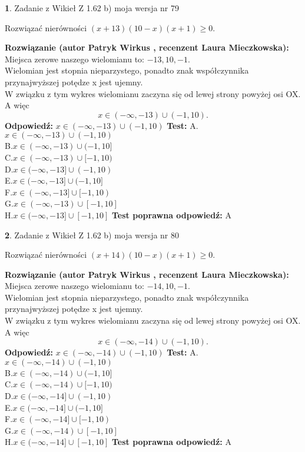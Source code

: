 \documentclass[12pt, a4paper]{article}
\theoremstyle{definition} %
\newtheorem{zad}{}
\newcommand{\zadStart}[1]{\begin{zad}#1\newline}
\newcommand{\zadStop}{\end{zad}}
\newcommand{\rozwStart}[2]{\noindent \textbf{Rozwiązanie (autor #1 , recenzent #2): }\newline}
\newcommand{\rozwStop}{\newline}
\newcommand{\odpStart}{\noindent \textbf{Odpowiedź:}\newline}
\newcommand{\odpStop}{\newline}
\newcommand{\testStart}{\noindent \textbf{Test:}\newline}
\newcommand{\testStop}{\newline}
\newcommand{\kluczStart}{\noindent \textbf{Test poprawna odpowiedź:}\newline}
\newcommand{\kluczStop}{\newline}
\begin{document}
\zadStart{Zadanie z Wikieł Z 1.62 b) moja wersja nr 79}

Rozwiązać nierówności $(x+13)(10-x)(x+1)\ge0$.
\zadStop
\rozwStart{Patryk Wirkus}{Laura Mieczkowska}
Miejsca zerowe naszego wielomianu to: $-13, 10, -1$.\\
Wielomian jest stopnia nieparzystego, ponadto znak współczynnika przy\linebreak najwyższej potędze x jest ujemny.\\ W związku z tym wykres wielomianu zaczyna się od lewej strony powyżej osi OX. A więc $$x \in (-\infty,-13) \cup (-1,10).$$
\rozwStop
\odpStart
$x \in (-\infty,-13) \cup (-1,10)$
\odpStop
\testStart
A.$x \in (-\infty,-13) \cup (-1,10)$\\
B.$x \in (-\infty,-13) \cup (-1,10]$\\
C.$x \in (-\infty,-13) \cup [-1,10)$\\
D.$x \in (-\infty,-13] \cup (-1,10)$\\
E.$x \in (-\infty,-13] \cup (-1,10]$\\
F.$x \in (-\infty,-13] \cup [-1,10)$\\
G.$x \in (-\infty,-13) \cup [-1,10]$\\
H.$x \in (-\infty,-13] \cup [-1,10]$
\testStop
\kluczStart
A
\kluczStop



\zadStart{Zadanie z Wikieł Z 1.62 b) moja wersja nr 80}

Rozwiązać nierówności $(x+14)(10-x)(x+1)\ge0$.
\zadStop
\rozwStart{Patryk Wirkus}{Laura Mieczkowska}
Miejsca zerowe naszego wielomianu to: $-14, 10, -1$.\\
Wielomian jest stopnia nieparzystego, ponadto znak współczynnika przy\linebreak najwyższej potędze x jest ujemny.\\ W związku z tym wykres wielomianu zaczyna się od lewej strony powyżej osi OX. A więc $$x \in (-\infty,-14) \cup (-1,10).$$
\rozwStop
\odpStart
$x \in (-\infty,-14) \cup (-1,10)$
\odpStop
\testStart
A.$x \in (-\infty,-14) \cup (-1,10)$\\
B.$x \in (-\infty,-14) \cup (-1,10]$\\
C.$x \in (-\infty,-14) \cup [-1,10)$\\
D.$x \in (-\infty,-14] \cup (-1,10)$\\
E.$x \in (-\infty,-14] \cup (-1,10]$\\
F.$x \in (-\infty,-14] \cup [-1,10)$\\
G.$x \in (-\infty,-14) \cup [-1,10]$\\
H.$x \in (-\infty,-14] \cup [-1,10]$
\testStop
\kluczStart
A
\kluczStop
\end{document}
